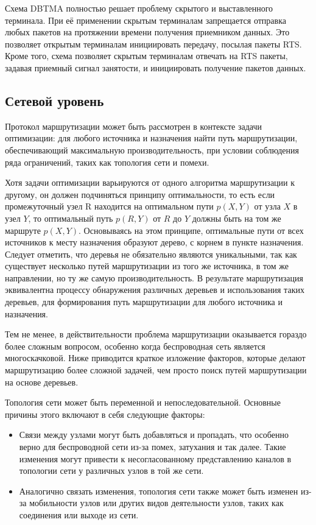 \documentclass[14pt,a4paper,titlepage]{extarticle}
\begin{document}
Схема DBTMA полностью решает проблему скрытого и выставленного терминала. При её применении скрытым терминалам запрещается отправка любых пакетов на протяжении времени получения приемником данных. Это позволяет открытым терминалам инициировать передачу, посылая пакеты RTS. Кроме того, схема позволяет скрытым терминалам отвечать на RTS пакеты, задавая приемный сигнал занятости, и инициировать получение пакетов данных.

\subsection{Сетевой уровень}
Протокол маршрутизации может быть рассмотрен в контексте задачи оптимизации: для любого источника и назначения найти путь маршрутизации, обеспечивающий максимальную производительность, при условии соблюдения ряда ограничений, таких как топология сети и помехи.

Хотя задачи оптимизации варьируются от одного алгоритма маршрутизации к другому, он должен подчиняться принципу оптимальности, то есть если промежуточный узел R находится на оптимальном пути $p(X, Y)$ от узла $X$ в узел $Y$, то оптимальный путь $p(R, Y)$ от $R$ до $Y$ должны быть на том же маршруте $p(X, Y)$. Основываясь на этом принципе, оптимальные пути от всех источников к месту назначения образуют дерево, с корнем в пункте назначения. Следует отметить, что деревья не обязательно являются уникальными, так как существует несколько путей маршрутизации из того же источника, в том же направлении, но ту же самую производительность. В результате маршрутизация эквивалентна процессу обнаружения различных деревьев и использования таких деревьев, для формирования путь маршрутизации для любого источника и назначения.

Тем не менее, в действительности проблема маршрутизации оказывается гораздо более сложным вопросом, особенно когда беспроводная сеть является многоскачковой. Ниже приводится краткое изложение факторов, которые делают маршрутизацию более сложной задачей, чем просто поиск путей маршрутизации на основе деревьев.

Топология сети может быть переменной и непоследовательной. Основные причины этого включают в себя следующие факторы:
\begin{itemize}
\item Связи между узлами могут быть добавляться и пропадать, что особенно верно для беспроводной сети из-за помех, затухания и так далее. Такие изменения могут привести к несогласованному представлению каналов в топологии сети у различных узлов в той же сети.
\item Аналогично связать изменения, топология сети также может быть изменен из-за мобильности узлов или других видов деятельности узлов, таких как соединения или выходе из сети.
\end{itemize}
\end{document}
